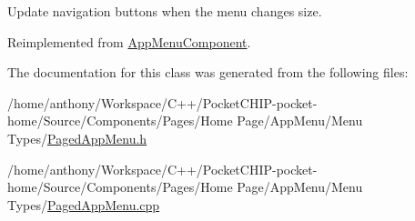 Update navigation buttons when the menu changes size. 

Reimplemented from \mbox{\hyperlink{classAppMenuComponent_a722d34923b746830bad57e960c4076a2}{App\+Menu\+Component}}.



The documentation for this class was generated from the following files\+:\begin{DoxyCompactItemize}
\item 
/home/anthony/\+Workspace/\+C++/\+Pocket\+C\+H\+I\+P-\/pocket-\/home/\+Source/\+Components/\+Pages/\+Home Page/\+App\+Menu/\+Menu Types/\mbox{\hyperlink{PagedAppMenu_8h}{Paged\+App\+Menu.\+h}}\item 
/home/anthony/\+Workspace/\+C++/\+Pocket\+C\+H\+I\+P-\/pocket-\/home/\+Source/\+Components/\+Pages/\+Home Page/\+App\+Menu/\+Menu Types/\mbox{\hyperlink{PagedAppMenu_8cpp}{Paged\+App\+Menu.\+cpp}}\end{DoxyCompactItemize}
